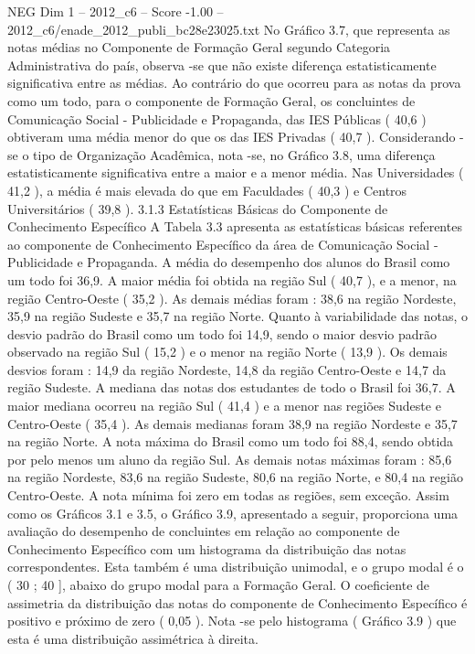 \begin{textsample}{NEG Dim 1 – 2012\_c6 – Score -1.00 – 2012\_c6/enade\_2012\_publi\_bc28e23025.txt}
No Gráfico 3.7, que representa as notas médias no Componente de Formação Geral segundo Categoria Administrativa do país, observa -se que não existe diferença estatisticamente significativa entre as médias.
Ao contrário do que ocorreu para as notas da prova como um todo, para o componente de Formação Geral, os concluintes de Comunicação Social - Publicidade e Propaganda, das IES Públicas ( 40,6 ) obtiveram uma média menor do que os das IES Privadas ( 40,7 ).
Considerando -se o tipo de Organização Acadêmica, nota -se, no Gráfico 3.8, uma diferença estatisticamente significativa entre a maior e a menor média.
Nas Universidades ( 41,2 ), a média é mais elevada do que em Faculdades ( 40,3 ) e Centros Universitários ( 39,8 ). 3.1.3 Estatísticas Básicas do Componente de Conhecimento Específico A Tabela 3.3 apresenta as estatísticas básicas referentes ao componente de Conhecimento Específico da área de Comunicação Social - Publicidade e Propaganda.
A média do desempenho dos alunos do Brasil como um todo foi 36,9.
A maior média foi obtida na região Sul ( 40,7 ), e a menor, na região Centro-Oeste ( 35,2 ).
As demais médias foram : 38,6 na região Nordeste, 35,9 na região Sudeste e 35,7 na região Norte.
Quanto à variabilidade das notas, o desvio padrão do Brasil como um todo foi 14,9, sendo o maior desvio padrão observado na região Sul ( 15,2 ) e o menor na região Norte ( 13,9 ).
Os demais desvios foram : 14,9 da região Nordeste, 14,8 da região Centro-Oeste e 14,7 da região Sudeste.
A mediana das notas dos estudantes de todo o Brasil foi 36,7.
A maior mediana ocorreu na região Sul ( 41,4 ) e a menor nas regiões Sudeste e Centro-Oeste ( 35,4 ).
As demais medianas foram 38,9 na região Nordeste e 35,7 na região Norte.
A nota máxima do Brasil como um todo foi 88,4, sendo obtida por pelo menos um aluno da região Sul.
As demais notas máximas foram : 85,6 na região Nordeste, 83,6 na região Sudeste, 80,6 na região Norte, e 80,4 na região Centro-Oeste.
A nota mínima foi zero em todas as regiões, sem exceção.
Assim como os Gráficos 3.1 e 3.5, o Gráfico 3.9, apresentado a seguir, proporciona uma avaliação do desempenho de concluintes em relação ao componente de Conhecimento Específico com um histograma da distribuição das notas correspondentes.
Esta também é uma distribuição unimodal, e o grupo modal é o ( 30 ; 40 ], abaixo do grupo modal para a Formação Geral.
O coeficiente de assimetria da distribuição das notas do componente de Conhecimento Específico é positivo e próximo de zero ( 0,05 ).
Nota -se pelo histograma ( Gráfico 3.9 ) que esta é uma distribuição assimétrica à direita.

\end{textsample}
